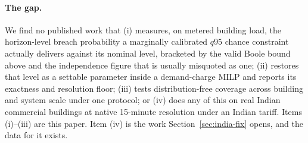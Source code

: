 \paragraph{The gap.} We find no published work that (i) measures, on metered
building load, the horizon-level breach probability a marginally calibrated
$q95$ chance constraint actually delivers against its nominal level, bracketed
by the valid Boole bound above and the independence figure that is usually
misquoted as one; (ii) restores that level as a settable parameter inside a
demand-charge MILP and reports its exactness and resolution floor; (iii) tests
distribution-free coverage across building and system scale under one
protocol; or (iv) does any of this on real Indian commercial buildings at
native 15-minute resolution under an Indian tariff. Items (i)--(iii) are this
paper. Item (iv) is the work Section~\ref{sec:india-fix} opens, and the data
for it exists.
